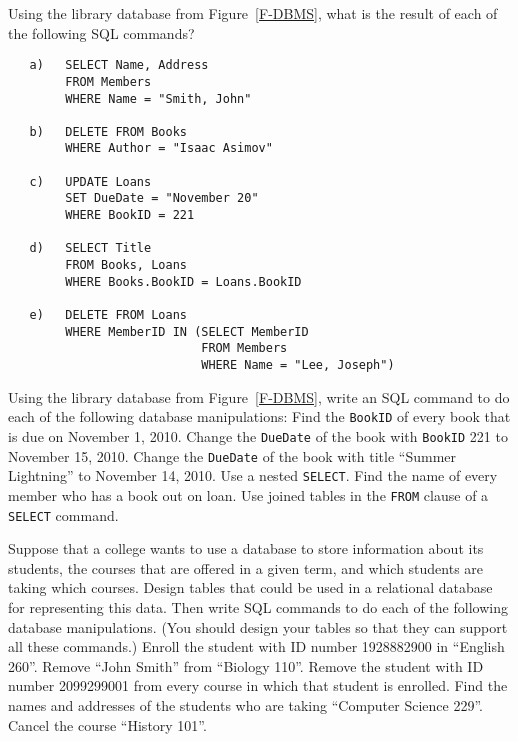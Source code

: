 \begin{exercises}

\problem Using the library database from Figure~\ref{F-DBMS},
what is the result of each of the following SQL commands?
\begin{verbatim}
   a)   SELECT Name, Address
        FROM Members
        WHERE Name = "Smith, John"
        
   b)   DELETE FROM Books
        WHERE Author = "Isaac Asimov"

   c)   UPDATE Loans
        SET DueDate = "November 20"
        WHERE BookID = 221

   d)   SELECT Title
        FROM Books, Loans
        WHERE Books.BookID = Loans.BookID
        
   e)   DELETE FROM Loans
        WHERE MemberID IN (SELECT MemberID
                           FROM Members
                           WHERE Name = "Lee, Joseph")
\end{verbatim}

\problem Using the library database from Figure~\ref{F-DBMS},
write an SQL command to do each of the following database
manipulations:
\ppart Find the \texttt{BookID} of every book that is due on
November 1, 2010.
\ppart Change the \texttt{DueDate} of the book with \texttt{BookID} 221
to November 15, 2010.
\ppart Change the \texttt{DueDate} of the book with title
``Summer Lightning'' to November 14, 2010.  Use a nested
\texttt{SELECT}.
\ppart Find the name of every member who has a book out on loan.
Use joined tables in the \texttt{FROM} clause of a \texttt{SELECT}
command.

\problem Suppose that a college wants to use a database to store
information about its students, the courses that are offered in
a given term, and which students are taking which courses.
Design tables that could be used in a relational
database for representing this data.  Then
write SQL commands to do each of the following database
manipulations.  (You should design your tables so that they
can support all these commands.)
\ppart Enroll the student with ID number 1928882900 in ``English 260''.
\ppart Remove ``John Smith'' from ``Biology 110''.
\ppart Remove the student with ID number 2099299001 from every course
in which that student is enrolled.
\ppart Find the names and addresses of the students who are taking ``Computer Science 229''.
\ppart Cancel the course ``History 101''.


\end{exercises}



